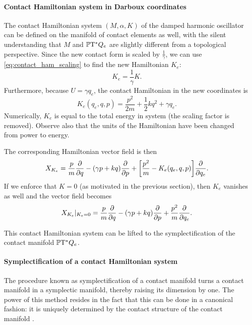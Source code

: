 \paragraph{Contact Hamiltonian system in Darboux coordinates} The contact Hamiltonian system \((M, \alpha, K)\) of the damped harmonic oscillator can be defined on the manifold of contact elements as well, with the silent understanding that \(M\) and \(\mathbb{P}\mathrm{T}^* Q_e\) are slightly different from a topological perspective. Since the new contact form is scaled by \(\tfrac{1}{\gamma}\), we can use \cref{eq:contact_ham_scaling} to find the new Hamiltonian \(K_e\):
\begin{equation}
     K_e = \frac{1}{\gamma} K.
\end{equation}
Furthermore, because \(U = \gamma q_e\), the contact Hamiltonian in the new coordinates is
\begin{equation}
    K_e(q_e, q, p) = \frac{p^2}{2m} + \frac{1}{2}kq^2 + \gamma q_e.
    \label{eq:dho_contact_hamiltonian_e}
\end{equation}
Numerically, \(K_e\) is equal to the total energy in system (the scaling factor is removed). Observe also that the units of the Hamiltonian have been changed from power to energy.

The corresponding Hamiltonian vector field is then
\begin{equation}
    X_{K_e} = \frac{p}{m}\pdv{}{q} - (\gamma p + kq) \pdv{}{p} + \qty[\frac{p^2}{m} - K_e(q_e, q, p)]\pdv{}{q_e}. 
    \label{eq:ham_vf_e}
\end{equation}
If we enforce that \(K = 0\) (as motivated in the previous section), then \(K_e\) vanishes as well and the vector field becomes 
\begin{equation}
    X_{K_e}\vert_{K_e = 0} = \frac{p}{m}\pdv{}{q} - (\gamma p + kq) \pdv{}{p} + \frac{p^2}{m}\pdv{}{q_e}.
    \label{eq:ham_vf_e_liouville}
\end{equation}

This contact Hamiltonian system can be lifted to the symplectification of the contact manifold \(\mathbb{P}\mathrm{T}^* Q_e\).

\paragraph{Symplectification of a contact Hamiltonian system} The procedure known as symplectification of a contact manifold turns a contact manifold in a symplectic manifold, thereby raising its dimension by one. The power of this method resides in the fact that this can be done in a canonical fashion: it is uniquely determined by the contact structure of the contact manifold \cite{Arnold1989}.

